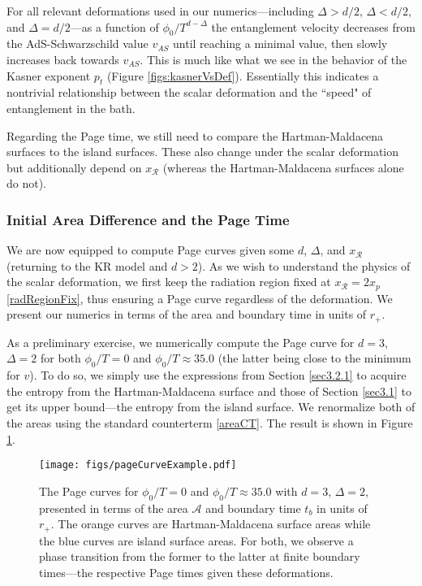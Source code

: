 \documentclass[12pt,a4paper]{article}
\begin{document}
For all relevant deformations used in our numerics---including $\Delta > d/2$, $\Delta < d/2$, and $\Delta = d/2$---as a function of $\phi_0/T^{d-\Delta}$ the entanglement velocity decreases from the AdS-Schwarzschild value $v_{AS}$ until reaching a minimal value, then slowly increases back towards $v_{AS}$. This is much like what we see in the behavior of the Kasner exponent $p_t$ (Figure \ref{figs:kasnerVsDef}). Essentially this indicates a nontrivial relationship between the scalar deformation and the ``speed" of entanglement in the bath.

Regarding the Page time, we still need to compare the Hartman-Maldacena surfaces to the island surfaces. These also change under the scalar deformation but additionally depend on $x_\mathcal{R}$ (whereas the Hartman-Maldacena surfaces alone do not).



\subsubsection{Initial Area Difference and the Page Time}\label{sec3.2.2}

We are now equipped to compute Page curves given some $d$, $\Delta$, and $x_\mathcal{R}$ (returning to the KR model and $d > 2$). As we wish to understand the physics of the scalar deformation, we first keep the radiation region fixed at $x_\mathcal{R}= 2 x_p$ \eqref{radRegionFix}, thus ensuring a Page curve regardless of the deformation. We present our numerics in terms of the area and boundary time in units of $r_+$.

As a preliminary exercise, we numerically compute the Page curve for $d = 3$, $\Delta = 2$ for both $\phi_0/T = 0$ and $\phi_0/T \approx 35.0$ (the latter being close to the minimum for $v$). To do so, we simply use the expressions from Section \ref{sec3.2.1} to acquire the entropy from the Hartman-Maldacena surface and those of Section \ref{sec3.1} to get its upper bound---the entropy from the island surface. We renormalize both of the areas using the standard counterterm \eqref{areaCT}. The result is shown in Figure \ref{figs:pageCurveEx}.

\begin{figure}
\texttt{[image: figs/pageCurveExample.pdf]}
\caption{The Page curves for $\phi_0/T = 0$ and $\phi_0/T \approx 35.0$ with $d = 3$, $\Delta = 2$, presented in terms of the area $\mathcal{A}$ and boundary time $t_b$ in units of $r_+$. The orange curves are Hartman-Maldacena surface areas while the blue curves are island surface areas. For both, we observe a phase transition from the former to the latter at finite boundary times---the respective Page times given these deformations.}
\label{figs:pageCurveEx}
\end{figure}
\end{document}
